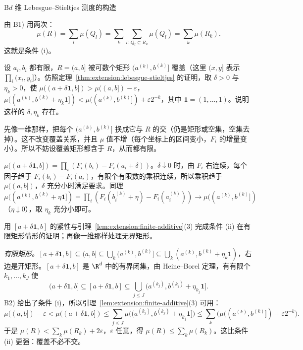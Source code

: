 \begin{probleme}{B}{$d$ 维 Lebesgue--Stieltjes 测度的构造}
\begin{questions}
\begin{solution}
由 B1) 用两次：
\[
\mu(R)=\sum_l\mu(Q_l)=\sum_k\sum_{l:\,Q_l\subseteq R_k}\mu(Q_l)=\sum_k\mu(R_k).
\]
这就是条件 (i)。
\end{solution}
\item 设 $a_i,b_i$ 都有限，$R=(a,b]$ 被可数个矩形 $(a^{(k)},b^{(k)}]$ 覆盖（这里 $(x,y]$ 表示 $\prod_i(x_i,y_i]$）。仿照定理~\ref{thm:extension:lebesgue-stieltjes} 的证明，取 $\delta>0$ 与 $\eta_k>0$，使 $\mu((a+\delta\mathbf 1,b])>\mu((a,b])-\varepsilon$，$\mu((a^{(k)},b^{(k)}+\eta_k\mathbf 1])<\mu((a^{(k)},b^{(k)}])+\varepsilon2^{-k}$，其中 $\mathbf 1=(1,\dots,1)$。说明这样的 $\delta,\eta_k$ 存在。
\begin{solution}
先像一维那样，把每个 $(a^{(k)},b^{(k)}]$ 换成它与 $R$ 的交（仍是矩形或空集，空集去掉）。这不改变覆盖关系，并且 $\mu$ 值不增（每个坐标上的区间变小，$F_i$ 的增量变小）。所以不妨设覆盖矩形都含于 $R$，从而都有限。

$\mu((a+\delta\mathbf 1,b])=\prod_i(F_i(b_i)-F_i(a_i+\delta))$。$\delta\downarrow0$ 时，由 $F_i$ 右连续，每个因子趋于 $F_i(b_i)-F_i(a_i)$，有限个有限数的乘积连续，所以乘积趋于 $\mu((a,b])$，$\delta$ 充分小时满足要求。同理 $\mu((a^{(k)},b^{(k)}+\eta\mathbf 1])=\prod_i(F_i(b_i^{(k)}+\eta)-F_i(a_i^{(k)}))\to\mu((a^{(k)},b^{(k)}])$（$\eta\downarrow0$），取 $\eta_k$ 充分小即可。
\end{solution}
\item 用 $[a+\delta\mathbf 1,b]$ 的紧性与引理~\ref{lem:extension:finite-additive}(3) 完成条件 (ii) 在有限矩形情形的证明；再像一维那样处理无界矩形。
\begin{solution}
\emph{有限矩形。}$[a+\delta\mathbf 1,b]\subseteq(a,b]\subseteq\bigcup_k(a^{(k)},b^{(k)}]\subseteq\bigcup_k(a^{(k)},b^{(k)}+\eta_k\mathbf 1)$，右边是开矩形。$[a+\delta\mathbf 1,b]$ 是 $\R^d$ 中的有界闭集，由 Heine--Borel 定理，有有限个 $k_1,\dots,k_J$ 使
\[
(a+\delta\mathbf 1,b]\subseteq[a+\delta\mathbf 1,b]\subseteq\bigcup_{j\leqslant J}(a^{(k_j)},b^{(k_j)}+\eta_{k_j}\mathbf 1].
\]
B2) 给出了条件 (i)，所以引理~\ref{lem:extension:finite-additive}(3) 可用：
\[
\mu((a,b])-\varepsilon<\mu((a+\delta\mathbf 1,b])\leqslant\sum_{j\leqslant J}\mu\bigl((a^{(k_j)},b^{(k_j)}+\eta_{k_j}\mathbf 1]\bigr)\leqslant\sum_k\bigl(\mu((a^{(k)},b^{(k)}])+\varepsilon2^{-k}\bigr).
\]
于是 $\mu(R)<\sum_k\mu(R_k)+2\varepsilon$，$\varepsilon$ 任意，得 $\mu(R)\leqslant\sum_k\mu(R_k)$。这比条件 (ii) 更强：覆盖不必不交。


\end{solution}
\end{questions}
\end{probleme}

